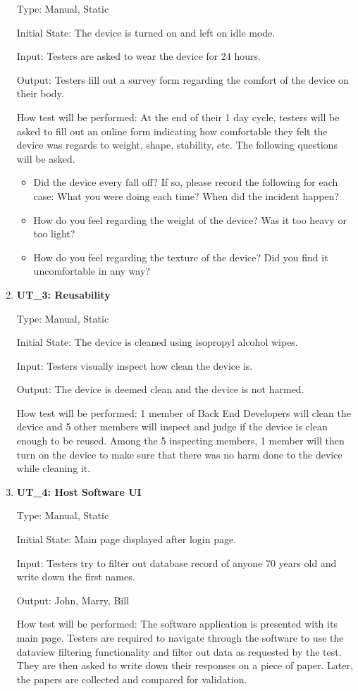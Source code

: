 \documentclass[12pt, titlepage]{article}
\begin{document}
\begin{enumerate}
Type: Manual, Static
					
Initial State: The device is turned on and left on idle mode.
					
Input: Testers are asked to wear the device for 24 hours.
					
Output: Testers fill out a survey form regarding the comfort of the device on their body.
					
How test will be performed: At the end of their 1 day cycle, testers will be asked to fill out an online form indicating how comfortable they felt the device was regards to weight, shape, stability, etc. The following questions will be asked.

\begin{itemize}
\item Did the device every fall off? If so, please record the following for each case: What you were doing each time? When did the incident happen?
\item How do you feel regarding the weight of the device? Was it too heavy or too light?
\item How do you feel regarding the texture of the device? Did you find it uncomfortable in any way?
\end{itemize}

\item\textbf{{UT\_3: Reusability\\}}\label{UT3}

Type: Manual, Static
					
Initial State: The device is cleaned using isopropyl alcohol wipes.
					
Input: Testers visually inspect how clean the device is.
					
Output: The device is deemed clean and the device is not harmed.
					
How test will be performed: 1 member of Back End Developers will clean the device and 5 other members will inspect and judge if the device is clean enough to be reused. Among the 5 inspecting members, 1 member will then turn on the device to make sure that there was no harm done to the device while cleaning it.

\item\textbf{{UT\_4: Host Software UI\\}}\label{UT4}

Type: Manual, Static
					
Initial State: Main page displayed after login page.
					
Input: Testers try to filter out database record of anyone 70 years old and write down the first names.
					
Output: John, Marry, Bill
					
How test will be performed: The software application is presented with its main page. Testers are required to navigate through the software to use the dataview filtering functionality and filter out data as requested by the test. They are then asked to write down their responses on a piece of paper. Later, the papers are collected and compared for validation.

\end{enumerate}
\end{document}
